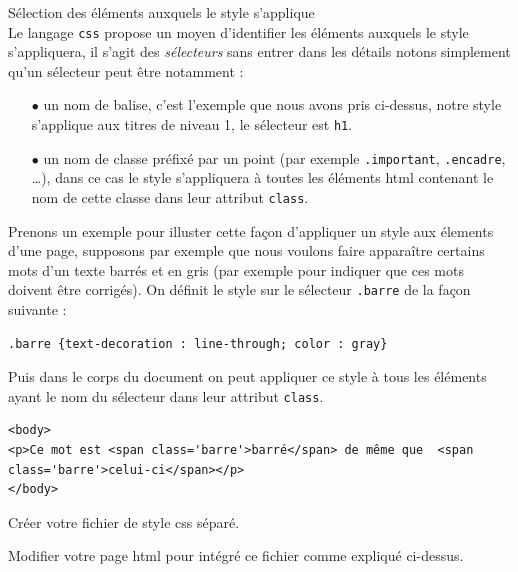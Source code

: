 \documentclass[11pt,a4paper]{article}
\begin{document}
{Sélection des éléments auxquels le style s'applique}\\
Le \og langage \fg \texttt{css} propose un moyen d'identifier les éléments auxquels le style s'appliquera, il s'agit des \textit{sélecteurs} sans entrer dans les détails notons simplement qu'un sélecteur peut être notamment :
\begin{itemize}
	\item[$\bullet$] un nom de balise, c'est l'exemple que nous avons pris ci-dessus, notre style s'applique aux titres de niveau 1, le sélecteur est \texttt{h1}.
	\item[$\bullet$] un nom de classe préfixé par un point (par exemple \texttt{.important}, \texttt{.encadre}, \dots), dans ce cas le style s'appliquera à toutes les éléments html contenant le nom de cette classe dans leur attribut \texttt{class}.
\end{itemize}
Prenons un exemple pour illuster cette façon d'appliquer un style aux élements d'une page, supposons par exemple que nous voulons faire apparaître certains mots d'un texte barrés et en gris (par exemple pour indiquer que ces mots doivent être corrigés). On définit le style sur le sélecteur \texttt{.barre} de la façon suivante :
\begin{lstlisting}[numbers=none]
.barre {text-decoration : line-through; color : gray}
\end{lstlisting}
Puis dans le corps du document on peut appliquer ce style à tous les éléments ayant le nom du sélecteur dans leur attribut \texttt{class}.
\begin{lstlisting}[numbers=none]
<body>
<p>Ce mot est <span class='barre'>barré</span> de même que  <span class='barre'>celui-ci</span></p>
</body>
\end{lstlisting}
\SQListe
\item Créer votre fichier de style css séparé.
\item Modifier votre page html pour intégré ce fichier comme expliqué ci-dessus.
\FinListe
\pagebreak
\end{document}
